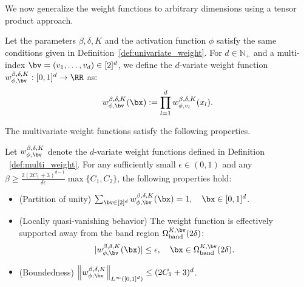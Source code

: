 \documentclass[11pt]{article}
\begin{document}
We now generalize the weight functions to arbitrary dimensions using a tensor product approach.

\begin{definition}
    Let the parameters $\beta, \delta, K$ and the activation function $\phi$ satisfy the same conditions given in Definition~\ref{def:univariate_weight}. For $d \in \mathbb{N}_{+}$ and a multi-index $\bv = (v_1, \dots, v_d) \in [2]^d$, we define the $d$-variate weight function $w_{\phi, \bv}^{\beta, \delta, K}: [0,1]^d \to \RR$ as:
    \begin{equation*}
        w_{\phi, \bv}^{\beta, \delta, K}(\bx): = \prod_{l=1}^d  w_{\phi, v_l}^{\beta, \delta, K}(x_l).
    \end{equation*}
    \label{def:multi_weight}
\end{definition}
The multivariate weight functions satisfy the following properties.
\begin{proposition}
    Let $w_{\phi, \bv}^{\beta, \delta, K}$ denote the $d$-variate weight functions defined in Definition ~\ref{def:multi_weight}. For any sufficiently small $\epsilon \in (0,1) $ and any $\beta \ge \frac{2(2C_1+3)^{d-1}}{\delta \epsilon} \max\{C_1,C_2\}$, the following properties hold:
    \begin{itemize}
        \item (Partition of unity) $\sum_{\bv \in [2]^d} w_{\phi,\bv}^{\beta, \delta, K}(\bx) = 1, \quad \bx \in [0,1]^d$.
        \item (Locally quasi-vanishing behavior) The weight function is effectively supported away from the band region $\Omega_{\mathrm{band}}^{K, \bv}(2 \delta)$:
        \begin{equation*}
            |w_{\phi, \bv}^{\beta, \delta, K}(\bx)| \leq \epsilon, \quad \bx \in \Omega_{\mathrm{band}}^{K, \bv}(2 \delta).
        \end{equation*}
        \item (Boundedness) $ \left\|w_{\phi, \bv}^{\beta, \delta, K}\right\|_{L^{\infty}([0,1]^d)} \leq (2 C_1 + 3)^d$.
    \end{itemize}
    \label{prop:multi_weight}
\end{proposition}
\end{document}
